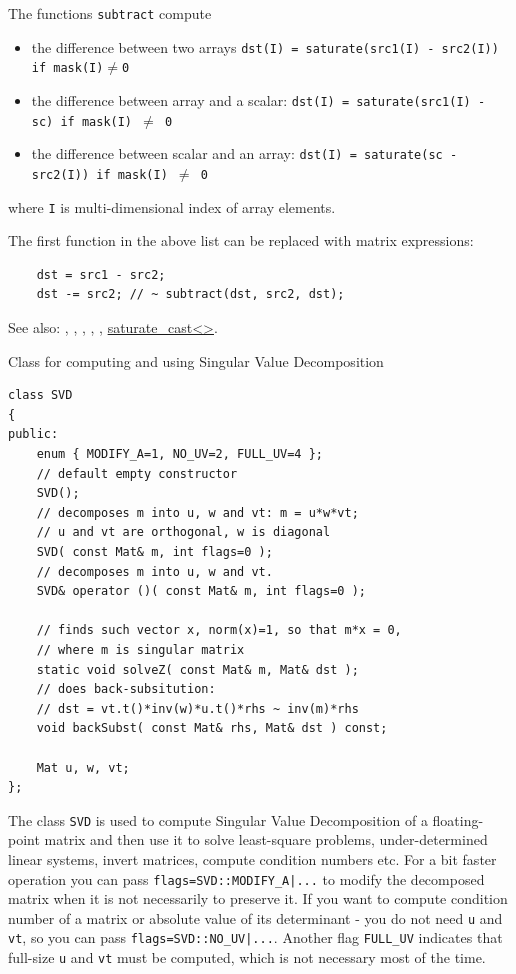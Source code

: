 The functions \texttt{subtract} compute

\begin{itemize}
    \item the difference between two arrays
    \texttt{dst(I) = saturate(src1(I) - src2(I)) if mask(I)$\ne$0}
    \item the difference between array and a scalar:
    \texttt{dst(I) = saturate(src1(I) - sc) if mask(I) $\ne$ 0}
    \item the difference between scalar and an array:
    \texttt{dst(I) = saturate(sc - src2(I)) if mask(I) $\ne$ 0}
\end{itemize}

where \texttt{I} is multi-dimensional index of array elements.

The first function in the above list can be replaced with matrix expressions:
\begin{lstlisting}
    dst = src1 - src2;
    dst -= src2; // ~ subtract(dst, src2, dst);
\end{lstlisting}

See also: , , , ,
, \href{saturate}{saturate\_cast<>}.

\label{SVD}
Class for computing and using Singular Value Decomposition

\begin{lstlisting}
class SVD
{
public:
    enum { MODIFY_A=1, NO_UV=2, FULL_UV=4 };
    // default empty constructor
    SVD();
    // decomposes m into u, w and vt: m = u*w*vt;
    // u and vt are orthogonal, w is diagonal
    SVD( const Mat& m, int flags=0 );
    // decomposes m into u, w and vt.
    SVD& operator ()( const Mat& m, int flags=0 );

    // finds such vector x, norm(x)=1, so that m*x = 0,
    // where m is singular matrix
    static void solveZ( const Mat& m, Mat& dst );
    // does back-subsitution:
    // dst = vt.t()*inv(w)*u.t()*rhs ~ inv(m)*rhs
    void backSubst( const Mat& rhs, Mat& dst ) const;

    Mat u, w, vt;
};
\end{lstlisting}

The class \texttt{SVD} is used to compute Singular Value Decomposition of a floating-point matrix and then use it to solve least-square problems, under-determined linear systems, invert matrices, compute condition numbers etc.
For a bit faster operation you can pass \texttt{flags=SVD::MODIFY\_A|...} to modify the decomposed matrix when it is not necessarily to preserve it. If you want to compute condition number of a matrix or absolute value of its determinant - you do not need \texttt{u} and \texttt{vt}, so you can pass \texttt{flags=SVD::NO\_UV|...}. Another flag \texttt{FULL\_UV} indicates that full-size \texttt{u} and \texttt{vt} must be computed, which is not necessary most of the time.

